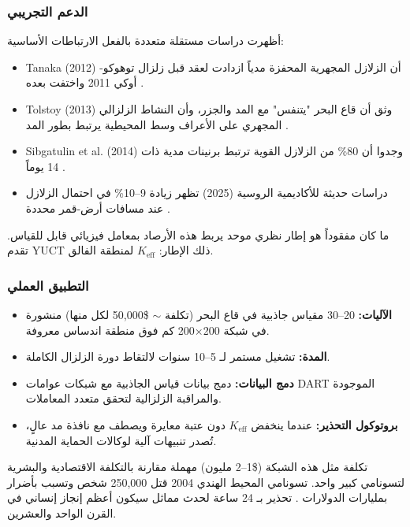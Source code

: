 \documentclass[12pt,a4paper]{article}
\theoremstyle{remark}
\begin{document}
	\subsubsection{الدعم التجريبي}
	
	أظهرت دراسات مستقلة متعددة بالفعل الارتباطات الأساسية:
	\begin{itemize}
		\item Tanaka (2012) أن الزلازل المجهرية المحفزة مدياً ازدادت لعقد قبل زلزال توهوكو-أوكي 2011 واختفت بعده \cite{Tanaka2012}.
		\item Tolstoy (2013) وثق أن قاع البحر "يتنفس" مع المد والجزر، وأن النشاط الزلزالي المجهري على الأعراف وسط المحيطية يرتبط بطور المد \cite{Tolstoy2013}.
		\item Sibgatulin et al. (2014) وجدوا أن 80\% من الزلازل القوية ترتبط برنينات مدية ذات 14 يوماً \cite{Sibgatulin2014}.
		\item دراسات حديثة للأكاديمية الروسية (2025) تظهر زيادة 9–10\% في احتمال الزلازل عند مسافات أرض-قمر محددة \cite{RAN2025}.
	\end{itemize}
	
	ما كان مفقوداً هو إطار نظري موحد يربط هذه الأرصاد بمعامل فيزيائي قابل للقياس. تقدم YUCT ذلك الإطار: \(K_{\mathrm{eff}}\) لمنطقة الفالق.
	
	\subsubsection{التطبيق العملي}
	
	\begin{itemize}
		\item \textbf{الآليات:} 20–30 مقياس جاذبية في قاع البحر (تكلفة \(\sim\) \$50,000 لكل منها) منشورة في شبكة 200×200 كم فوق منطقة اندساس معروفة.
		\item \textbf{المدة:} تشغيل مستمر لـ 5–10 سنوات لالتقاط دورة الزلزال الكاملة.
		\item \textbf{دمج البيانات:} دمج بيانات قياس الجاذبية مع شبكات عوامات DART الموجودة \cite{NOAA2024} والمراقبة الزلزالية \cite{USGS2024} لتحقق متعدد المعاملات.
		\item \textbf{بروتوكول التحذير:} عندما ينخفض \(K_{\mathrm{eff}}\) دون عتبة معايرة ويصطف مع نافذة مد عالٍ، تُصدر تنبيهات آلية لوكالات الحماية المدنية.
	\end{itemize}
	
	تكلفة مثل هذه الشبكة (\$1–2 مليون) مهملة مقارنة بالتكلفة الاقتصادية والبشرية لتسونامي كبير واحد. تسونامي المحيط الهندي 2004 قتل 250,000 شخص وتسبب بأضرار بمليارات الدولارات \cite{NOAA2024, USGS2024}. تحذير بـ 24 ساعة لحدث مماثل سيكون أعظم إنجاز إنساني في القرن الواحد والعشرين.
	
\end{document}
